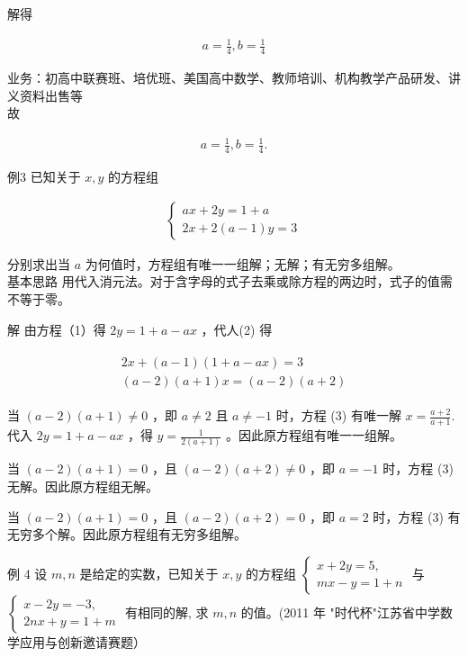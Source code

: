 \documentclass[10pt]{article}
\begin{document}
解得

\begin{align*}
a=\frac{1}{4}, b=\frac{1}{4}
\end{align*}

业务：初高中联赛班、培优班、美国高中数学、教师培训、机构教学产品研发、讲义资料出售等\\
故

\begin{align*}
a=\frac{1}{4}, b=\frac{1}{4} .
\end{align*}

例3 已知关于 $x, y$ 的方程组

\begin{align*}
\left\{\begin{array}{l}
a x+2 y=1+a  \tag{1}\\
2 x+2(a-1) y=3
\end{array}\right.
\end{align*}

分别求出当 $a$ 为何值时，方程组有唯一一组解；无解；有无穷多组解。\\
基本思路 用代入消元法。对于含字母的式子去乘或除方程的两边时，式子的值需不等于零。

解 由方程（1）得 $2 y=1+a-a x$ ，代人(2) 得

\begin{align*}
\begin{gather*}
2 x+(a-1)(1+a-a x)=3 \\
(a-2)(a+1) x=(a-2)(a+2)
\end{gather*} \tag{3}
\end{align*}

当 $(a-2)(a+1) \neq 0$ ，即 $a \neq 2$ 且 $a \neq-1$ 时，方程 (3) 有唯一解 $x=\frac{a+2}{a+1}$.代入 $2 y=1+a-a x$ ，得 $y=\frac{1}{2(a+1)}$ 。因此原方程组有唯一一组解。

当 $(a-2)(a+1)=0$ ，且 $(a-2)(a+2) \neq 0$ ，即 $a=-1$ 时，方程 (3) 无解。因此原方程组无解。

当 $(a-2)(a+1)=0$ ，且 $(a-2)(a+2)=0$ ，即 $a=2$ 时，方程 (3) 有无穷多个解。因此原方程组有无穷多组解。

例 4 设 $m, n$ 是给定的实数，已知关于 $x, y$ 的方程组 $\left\{\begin{array}{l}x+2 y=5, \\ m x-y=1+n\end{array}\right.$ 与 $\left\{\begin{array}{l}x-2 y=-3, \\ 2 n x+y=1+m\end{array}\right.$ 有相同的解, 求 $m, n$ 的值。(2011 年 "时代杯"江苏省中学数学应用与创新邀请赛题）
\end{document}
